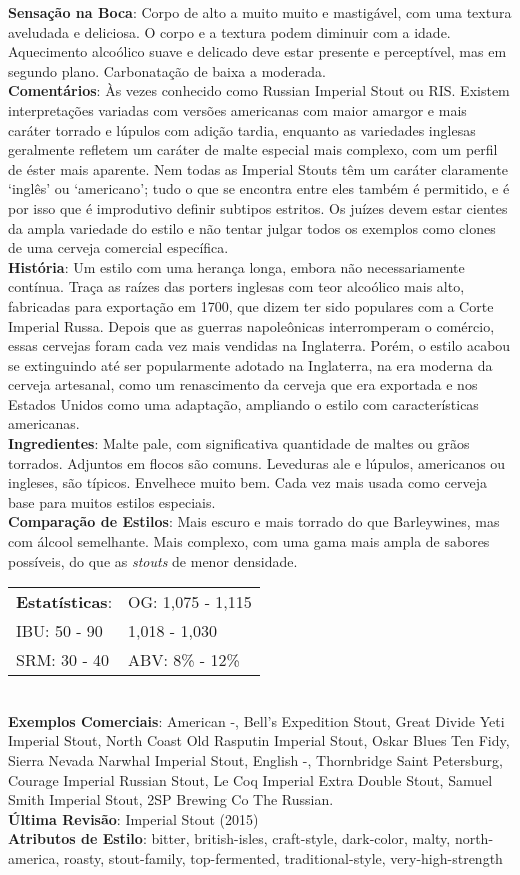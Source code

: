 \textbf{Sensação na Boca}: Corpo de alto a muito muito e mastigável, com uma textura aveludada e deliciosa. O corpo e a textura podem diminuir com a idade. Aquecimento alcoólico suave e delicado deve estar presente e perceptível, mas em segundo plano. Carbonatação de baixa a moderada. \\
\textbf{Comentários}: Às vezes conhecido como Russian Imperial Stout ou RIS. Existem interpretações variadas com versões americanas com maior amargor e mais caráter torrado e lúpulos com adição tardia, enquanto as variedades inglesas geralmente refletem um caráter de malte especial mais complexo, com um perfil de éster mais aparente. Nem todas as Imperial Stouts têm um caráter claramente ‘inglês’ ou ‘americano’; tudo o que se encontra entre eles também é permitido, e é por isso que é improdutivo definir subtipos estritos. Os juízes devem estar cientes da ampla variedade do estilo e não tentar julgar todos os exemplos como clones de uma cerveja comercial específica. \\
\textbf{História}: Um estilo com uma herança longa, embora não necessariamente contínua. Traça as raízes das porters inglesas com teor alcoólico mais alto, fabricadas para exportação em 1700, que dizem ter sido populares com a Corte Imperial Russa. Depois que as guerras napoleônicas interromperam o comércio, essas cervejas foram cada vez mais vendidas na Inglaterra. Porém, o estilo acabou se extinguindo até ser popularmente adotado na Inglaterra, na era moderna da cerveja artesanal, como um renascimento da cerveja que era exportada e nos Estados Unidos como uma adaptação, ampliando o estilo com características americanas. \\
\textbf{Ingredientes}: Malte pale, com significativa quantidade de maltes ou grãos torrados. Adjuntos em flocos são comuns. Leveduras ale e lúpulos, americanos ou ingleses, são típicos. Envelhece muito bem. Cada vez mais usada como cerveja base para muitos estilos especiais. \\
\textbf{Comparação de Estilos}: Mais escuro e mais torrado do que Barleywines, mas com álcool semelhante. Mais complexo, com uma gama mais ampla de sabores possíveis, do que as \textit{stouts} de menor densidade. \\
\begin{tabular}{@{}p{35mm}p{35mm}@{}}
  \textbf{Estatísticas}: & OG: 1,075 - 1,115 \\
  IBU: 50 - 90  & 1,018 - 1,030 \\
  SRM: 30 - 40  & ABV: 8\% - 12\%
\end{tabular}\\
\textbf{Exemplos Comerciais}: American -, Bell's Expedition Stout, Great Divide Yeti Imperial Stout, North Coast Old Rasputin Imperial Stout, Oskar Blues Ten Fidy, Sierra Nevada Narwhal Imperial Stout, English -, Thornbridge Saint Petersburg, Courage Imperial Russian Stout, Le Coq Imperial Extra Double Stout, Samuel Smith Imperial Stout, 2SP Brewing Co The Russian. \\
\textbf{Última Revisão}: Imperial Stout (2015) \\
\textbf{Atributos de Estilo}: bitter, british-isles, craft-style, dark-color, malty, north-america, roasty, stout-family, top-fermented, traditional-style, very-high-strength
